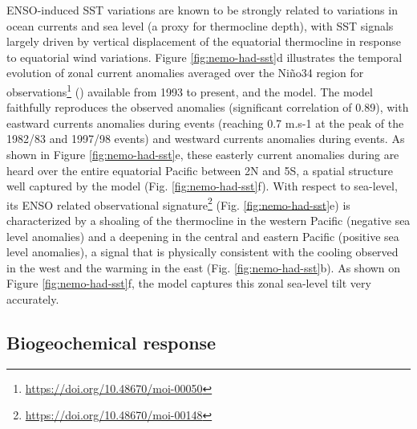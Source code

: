 ENSO-induced SST variations are known to be strongly related to variations in ocean currents and sea level (a proxy for thermocline depth), with SST signals largely driven by vertical displacement of the equatorial thermocline in response to equatorial wind variations. Figure \ref{fig:nemo-had-sst}d illustrates the temporal evolution of zonal current anomalies averaged over the Niño34 region for observations\footnote{\url{https://doi.org/10.48670/moi-00050}} (\citealp{rioGOCEOceanCirculation2014}) available from 1993 to present, and the model. The model faithfully reproduces the observed anomalies (significant correlation of 0.89), with eastward currents anomalies during \nino{} events (reaching 0.7 m.s-1 at the peak of the 1982/83 and 1997/98 events) and westward currents anomalies during \nina{} events. As shown in Figure \ref{fig:nemo-had-sst}e, these easterly current anomalies during \nino{} are heard over the entire equatorial Pacific between 2N and 5S, a spatial structure well captured by the model (Fig. \ref{fig:nemo-had-sst}f).
With respect to sea-level, its ENSO related observational signature\footnote{\url{https://doi.org/10.48670/moi-00148}} (Fig. \ref{fig:nemo-had-sst}e) is characterized by a shoaling of the thermocline in the western Pacific (negative sea level anomalies) and a deepening in the central and eastern Pacific (positive sea level anomalies), a signal that is physically consistent with the cooling observed in the west and the warming in the east (Fig. \ref{fig:nemo-had-sst}b). As shown on Figure \ref{fig:nemo-had-sst}f, the model captures this zonal sea-level tilt very accurately.

\subsection{Biogeochemical response}

